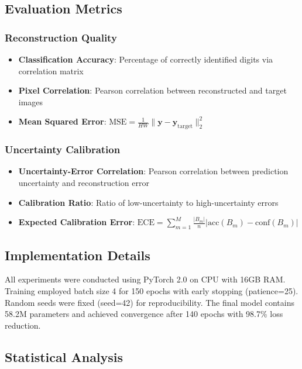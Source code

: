 \subsection{Evaluation Metrics}

\subsubsection{Reconstruction Quality}
\begin{itemize}
    \item \textbf{Classification Accuracy}: Percentage of correctly identified digits via correlation matrix
    \item \textbf{Pixel Correlation}: Pearson correlation between reconstructed and target images
    \item \textbf{Mean Squared Error}: $\text{MSE} = \frac{1}{HW}\|\mathbf{y} - \mathbf{y}_{\text{target}}\|_2^2$
\end{itemize}

\subsubsection{Uncertainty Calibration}
\begin{itemize}
    \item \textbf{Uncertainty-Error Correlation}: Pearson correlation between prediction uncertainty and reconstruction error
    \item \textbf{Calibration Ratio}: Ratio of low-uncertainty to high-uncertainty errors
    \item \textbf{Expected Calibration Error}: $\text{ECE} = \sum_{m=1}^M \frac{|B_m|}{n}|\text{acc}(B_m) - \text{conf}(B_m)|$
\end{itemize}

\subsection{Implementation Details}

All experiments were conducted using PyTorch 2.0 on CPU with 16GB RAM. Training employed batch size 4 for 150 epochs with early stopping (patience=25). Random seeds were fixed (seed=42) for reproducibility. The final model contains 58.2M parameters and achieved convergence after 140 epochs with 98.7\% loss reduction.

\subsection{Statistical Analysis}

